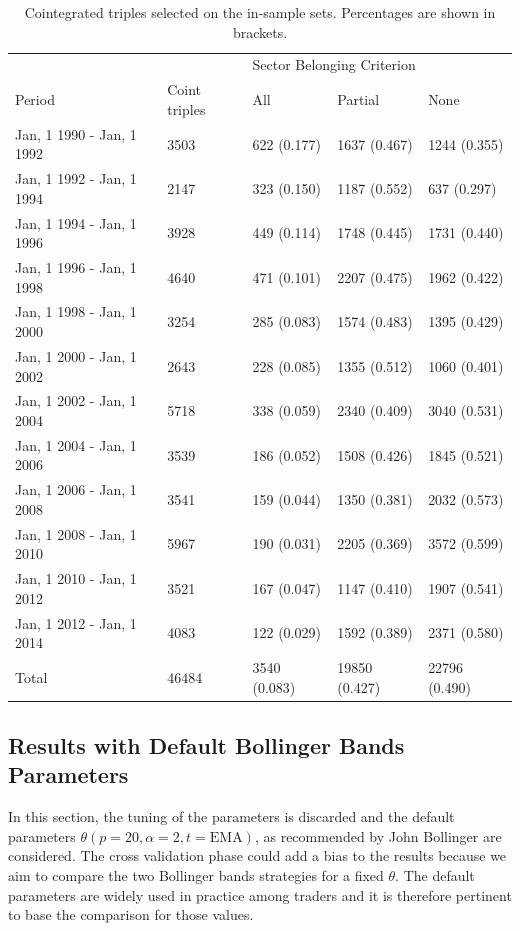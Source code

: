 \documentclass[11pt,a4,twosided,singlespacing,titlepagenumber=on]{scrreprt}
\numberwithin{equation}{chapter} %
\theoremstyle{remark}
\begin{document}
\begin{table}[H]
\centering
\begin{tabular}{lllll}
\hline
                              && \multicolumn{3}{l}{Sector Belonging Criterion}  \\
Period & Coint triples & All & Partial & None \\
\hline
Jan, 1 1990 - Jan, 1 1992 & 3503    & 622 (0.177) & 1637 (0.467) & 1244 (0.355) \\
Jan, 1 1992 - Jan, 1 1994 & 2147    & 323 (0.150) & 1187 (0.552)  & 637 (0.297) \\
Jan, 1 1994 - Jan, 1 1996 & 3928    & 449 (0.114) & 1748 (0.445)  & 1731 (0.440) \\
Jan, 1 1996 - Jan, 1 1998 & 4640    & 471 (0.101) & 2207 (0.475)  & 1962 (0.422) \\
Jan, 1 1998 - Jan, 1 2000 & 3254    & 285 (0.083) & 1574 (0.483)  & 1395 (0.429) \\
Jan, 1 2000 - Jan, 1 2002 & 2643    & 228 (0.085) & 1355 (0.512)  & 1060 (0.401)\\
Jan, 1 2002 - Jan, 1 2004 & 5718    & 338 (0.059) & 2340 (0.409)  & 3040 (0.531) \\
Jan, 1 2004 - Jan, 1 2006 & 3539    & 186 (0.052) & 1508 (0.426)  & 1845 (0.521) \\
Jan, 1 2006 - Jan, 1 2008 & 3541    & 159 (0.044) & 1350 (0.381)  & 2032 (0.573) \\
Jan, 1 2008 - Jan, 1 2010 & 5967    & 190 (0.031) & 2205 (0.369)  & 3572 (0.599) \\
Jan, 1 2010 - Jan, 1 2012 & 3521    & 167 (0.047) & 1147 (0.410)  & 1907 (0.541) \\
Jan, 1 2012 - Jan, 1 2014 & 4083    & 122 (0.029) & 1592 (0.389)  & 2371 (0.580) \\
\hline
Total & 46484 & 3540 (0.083) & 19850 (0.427) & 22796 (0.490) \\
\hline
\end{tabular}
\caption{Cointegrated triples selected on the in-sample sets. Percentages are shown in brackets.}
\label{tab:calibration_selection}
\end{table}

\subsection{Results with Default Bollinger Bands Parameters}
In this section, the tuning of the parameters is discarded and the default parameters $\theta (p=20, \alpha = 2, t = \text{EMA})$, as recommended by John Bollinger are considered. The cross validation phase could add a bias to the results because we aim to compare the two Bollinger bands strategies for a fixed $\theta$. The default parameters are widely used in practice among traders and it is therefore pertinent to base the comparison for those values. 
\end{document}
